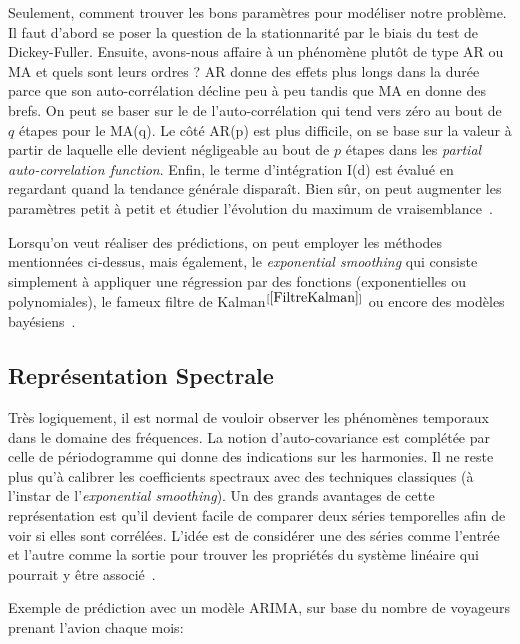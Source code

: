 Seulement, comment trouver les bons paramètres pour modéliser notre problème. Il faut d'abord se poser la question de la stationnarité par le biais du test de Dickey-Fuller. Ensuite, avons-nous affaire à un phénomène plutôt de type AR ou MA et quels sont leurs ordres ? AR donne des effets plus longs dans la durée parce que son auto-corrélation décline peu à peu tandis que MA en donne des brefs. On peut se baser sur le  de l'auto-corrélation qui tend vers zéro au bout de $q$ étapes pour le MA(q). Le côté AR(p) est plus difficile, on se base sur la valeur à partir de laquelle elle devient négligeable au bout de $p$ étapes dans les \textit{partial auto-correlation function}. Enfin, le terme d'intégration I(d) est évalué en regardant quand la tendance générale disparaît. Bien sûr, on peut augmenter les paramètres petit à petit et étudier l'évolution du maximum de vraisemblance~\cite{chatfield2016analysis}.

Lorsqu'on veut réaliser des prédictions, on peut employer les méthodes mentionnées ci-dessus, mais également, le \textit{exponential smoothing} qui consiste simplement à appliquer une régression par des fonctions (exponentielles ou polynomiales), le fameux filtre de Kalman$^{[\ref{FiltreKalman}]}$ ou encore des modèles bayésiens~\cite{shumway2010time}.

\subsection{Représentation Spectrale}

Très logiquement, il est normal de vouloir observer les phénomènes temporaux dans le domaine des fréquences. La notion d'auto-covariance est complétée par celle de périodogramme qui donne des indications sur les harmonies. Il ne reste plus qu'à calibrer les coefficients spectraux avec des techniques classiques (à l'instar de l'\textit{exponential smoothing}). Un des grands avantages de cette représentation est qu'il devient facile de comparer deux séries temporelles afin de voir si elles sont corrélées. L'idée est de considérer une des séries comme l'entrée et l'autre comme la sortie pour trouver les propriétés du système linéaire qui pourrait y être associé~\cite{box2015time}.

Exemple de prédiction avec un modèle ARIMA, sur base du nombre de voyageurs prenant l'avion chaque mois:

\lstset{basicstyle=\scriptsize}


